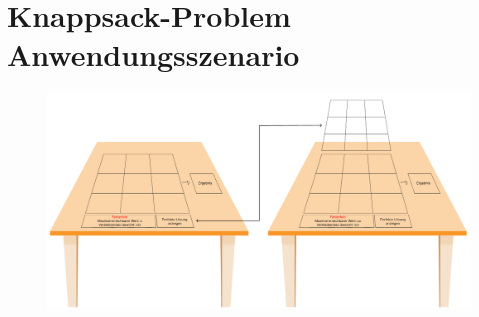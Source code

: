 \section{Knappsack-Problem Anwendungsszenario}
\begin{figure}[H]
    \centering
    \includegraphics[scale=1, angle=90]{images/MockUpKnapsack}
\end{figure}
\newpage

